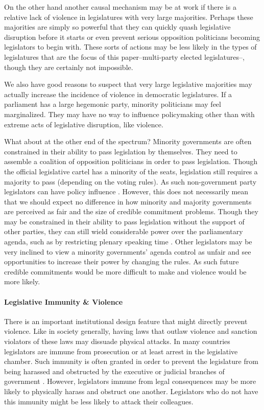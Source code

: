 \documentclass[a4paper]{article}\usepackage[]{graphicx}\usepackage[]{color}
\begin{document}
On the other hand another causal mechanism may be at work if there is a relative lack of violence in legislatures with very large majorities. Perhaps these majorities are simply so powerful that they can quickly quash legislative disruption before it starts or even prevent serious opposition politicians becoming legislators to begin with. These sorts of actions may be less likely in the types of legislatures that are the focus of this paper--multi-party elected legislatures--, though they are certainly not impossible. 

We also have good reasons to suspect that very large legislative majorities may actually increase the incidence of violence in democratic legislatures. If a parliament has a large hegemonic party, minority politicians may feel marginalized. They may have no way to influence policymaking other than with extreme acts of legislative disruption, like violence.

What about at the other end of the spectrum? Minority governments are often constrained in their ability to pass legislation by themselves. They need to assemble a coalition of opposition politicians in order to pass legislation. Though the official legislative cartel has a minority of the seats, legislation still requires a majority to pass (depending on the voting rules). As such non-government party legislators can have policy influence \citep{strom1990minority}. However, this does not necessarily mean that we should expect no difference in how minority and majority governments are perceived as fair and the size of credible commitment problems. Though they may be constrained in their ability to pass legislation without the support of other parties, they can still wield considerable power over the parliamentary agenda, such as by restricting plenary speaking time \citep{Tsebelis2002,cox2005,cox2007}. Other legislators may be very inclined to view a minority governments' agenda control as unfair and see opportunities to increase their power by changing the rules. As such future credible commitments would be more difficult to make and violence would be more likely. 

\paragraph{Legislative Immunity \& Violence}

There is an important institutional design feature that might directly prevent violence. Like in society generally, having laws that outlaw violence and sanction violators of these laws may dissuade physical attacks. In many countries legislators are immune from prosecution or at least arrest in the legislative chamber. Such immunity is often granted in order to prevent the legislature from being harassed and obstructed by the executive or judicial branches of government  \citep{Seghetti1984}. However, legislators immune from legal consequences may be more likely to physically harass and obstruct one another. Legislators who do not have this immunity might be less likely to attack their colleagues. 
\end{document}
